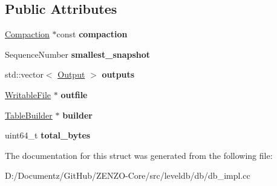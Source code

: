 \subsection*{Public Attributes}
\begin{DoxyCompactItemize}
\item 
\mbox{\label{structleveldb_1_1_d_b_impl_1_1_compaction_state_a6b92e9f2249d5977b4801bdf47afed28}} 
\mbox{\hyperlink{classleveldb_1_1_compaction}{Compaction}} $\ast$const {\bfseries compaction}
\item 
\mbox{\label{structleveldb_1_1_d_b_impl_1_1_compaction_state_a725f0984b8372c51691d72f66672dc89}} 
Sequence\+Number {\bfseries smallest\+\_\+snapshot}
\item 
\mbox{\label{structleveldb_1_1_d_b_impl_1_1_compaction_state_acce338739aafdfa40083ae3d5aacf24a}} 
std\+::vector$<$ \mbox{\hyperlink{structleveldb_1_1_d_b_impl_1_1_compaction_state_1_1_output}{Output}} $>$ {\bfseries outputs}
\item 
\mbox{\label{structleveldb_1_1_d_b_impl_1_1_compaction_state_a4c8e3de65efc30fdf33197d544a466f9}} 
\mbox{\hyperlink{classleveldb_1_1_writable_file}{Writable\+File}} $\ast$ {\bfseries outfile}
\item 
\mbox{\label{structleveldb_1_1_d_b_impl_1_1_compaction_state_a5335b9d45bc03378219e3fbc366fce21}} 
\mbox{\hyperlink{classleveldb_1_1_table_builder}{Table\+Builder}} $\ast$ {\bfseries builder}
\item 
\mbox{\label{structleveldb_1_1_d_b_impl_1_1_compaction_state_a21aa7304978dffc6841c4c11761f4b71}} 
uint64\+\_\+t {\bfseries total\+\_\+bytes}
\end{DoxyCompactItemize}


The documentation for this struct was generated from the following file\+:\begin{DoxyCompactItemize}
\item 
D\+:/\+Documentz/\+Git\+Hub/\+Z\+E\+N\+Z\+O-\/\+Core/src/leveldb/db/db\+\_\+impl.\+cc\end{DoxyCompactItemize}

